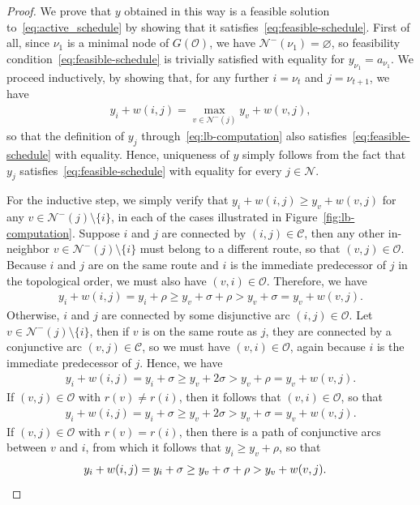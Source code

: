 \documentclass[a4paper]{report}
\theoremstyle{definition}
\theoremstyle{plain}
\begin{document}
\begin{proof}
  We prove that $y$ obtained in this way is a feasible solution to~\eqref{eq:active_schedule} by
  showing that it satisfies~\eqref{eq:feasible-schedule}.
  First of all, since $\nu_1$ is a minimal node of $G(\mathcal{O})$, we have
  $\mathcal{N}^-(\nu_1) = \varnothing$, so feasibility condition~\eqref{eq:feasible-schedule} is trivially satisfied
  with equality for $y_{\nu_1} = a_{\nu_1}$. We proceed inductively, by showing that,
  for any further $i = \nu_t$ and $j = \nu_{t+1}$, we have
  \begin{align}
    \label{eq:max-arc}
    y_i + w(i,j) = \max_{v \in \mathcal{N}^-(j)} y_v + w(v,j) ,
  \end{align}
  so that the definition of $y_j$ through~\eqref{eq:lb-computation} also
  satisfies~\eqref{eq:feasible-schedule} with equality.
  Hence, uniqueness of $y$ simply follows from the fact that $y_j$
  satisfies~\eqref{eq:feasible-schedule} with equality for every $j \in \mathcal{N}$.

  For the inductive step, we simply verify that
  $y_{i} + w(i,j) \geq y_{v} + w(v,j)$ for any $v \in \mathcal{N}^{-}(j) \setminus \{i\}$, in
  each of the cases illustrated in Figure~\ref{fig:lb-computation}.
  Suppose $i$ and $j$ are connected by $(i,j) \in \mathcal{C}$, then any other
  in-neighbor $v \in \mathcal{N}^-(j) \setminus \{ i \}$ must belong to a different route,
  so that $(v,j) \in \mathcal{O}$. Because $i$ and $j$ are on the same route and
  $i$ is the immediate predecessor of $j$ in the topological order, we must also
  have $(v,i) \in \mathcal{O}$. Therefore, we have
  \begin{align*}
    y_i + w(i,j) = y_i + \rho \geq y_v + \sigma + \rho > y_v + \sigma = y_v + w(v,j) .
  \end{align*}
  Otherwise, $i$ and $j$ are connected by some disjunctive arc
  $(i,j) \in \mathcal{O}$. Let $v \in \mathcal{N}^-(j) \setminus \{i\}$, then if $v$ is on the
  same route as $j$, they are connected by a conjunctive arc
  $(v,j) \in \mathcal{C}$, so we must have $(v,i) \in \mathcal{O}$, again because
  $i$ is the immediate predecessor of $j$. Hence, we have
  \begin{align*}
    y_i + w(i,j) = y_i + \sigma \geq y_v + 2 \sigma > y_{v} + \rho = y_{v} + w(v,j) .
  \end{align*}
  If $(v, j) \in \mathcal{O}$ with $r(v) \neq r(i)$, then it follows that
  $(v,i) \in \mathcal{O}$, so that
  \begin{align*}
    y_{i} + w(i,j) = y_i + \sigma \geq y_v + 2\sigma > y_v + \sigma = y_v + w(v,j) .
  \end{align*}
  If $(v, j) \in \mathcal{O}$ with $r(v) = r(i)$, then there is a path of
  conjunctive arcs between $v$ and $i$, from which it follows that
  $y_i \geq y_{v} + \rho$, so that
  \begin{align*}
    y_i + w(i,j) = y_i + \sigma \geq y_v + \sigma + \rho > y_v + w(v, j) . & \qedhere
  \end{align*}
\end{proof}
\end{document}

